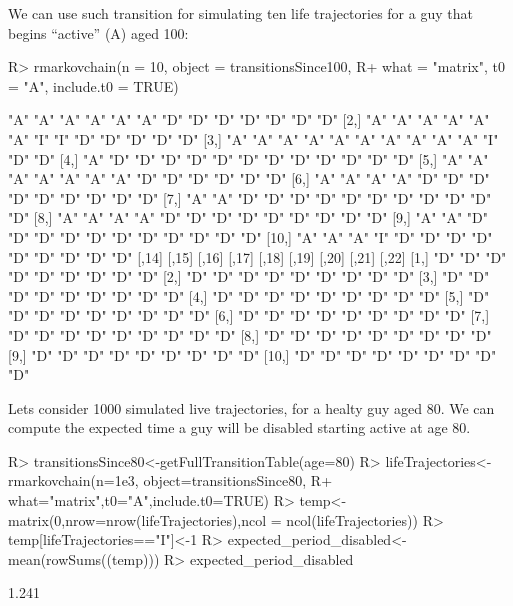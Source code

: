 \documentclass[
  nojss]{jss}
\begin{document}
We can use such transition for simulating ten life trajectories for a guy that begins ``active'' (A) aged 100:

\begin{CodeChunk}

\begin{CodeInput}
R> rmarkovchain(n = 10, object = transitionsSince100,
R+              what = "matrix", t0 = "A", include.t0 = TRUE)
\end{CodeInput}

\begin{CodeOutput}
      [,1] [,2] [,3] [,4] [,5] [,6] [,7] [,8] [,9] [,10] [,11] [,12] [,13]
 [1,] "A"  "A"  "A"  "A"  "A"  "A"  "D"  "D"  "D"  "D"   "D"   "D"   "D"  
 [2,] "A"  "A"  "A"  "A"  "A"  "A"  "I"  "I"  "D"  "D"   "D"   "D"   "D"  
 [3,] "A"  "A"  "A"  "A"  "A"  "A"  "A"  "A"  "A"  "A"   "I"   "D"   "D"  
 [4,] "A"  "D"  "D"  "D"  "D"  "D"  "D"  "D"  "D"  "D"   "D"   "D"   "D"  
 [5,] "A"  "A"  "A"  "A"  "A"  "A"  "A"  "D"  "D"  "D"   "D"   "D"   "D"  
 [6,] "A"  "A"  "A"  "A"  "D"  "D"  "D"  "D"  "D"  "D"   "D"   "D"   "D"  
 [7,] "A"  "A"  "D"  "D"  "D"  "D"  "D"  "D"  "D"  "D"   "D"   "D"   "D"  
 [8,] "A"  "A"  "A"  "A"  "D"  "D"  "D"  "D"  "D"  "D"   "D"   "D"   "D"  
 [9,] "A"  "A"  "D"  "D"  "D"  "D"  "D"  "D"  "D"  "D"   "D"   "D"   "D"  
[10,] "A"  "A"  "A"  "I"  "D"  "D"  "D"  "D"  "D"  "D"   "D"   "D"   "D"  
      [,14] [,15] [,16] [,17] [,18] [,19] [,20] [,21] [,22]
 [1,] "D"   "D"   "D"   "D"   "D"   "D"   "D"   "D"   "D"  
 [2,] "D"   "D"   "D"   "D"   "D"   "D"   "D"   "D"   "D"  
 [3,] "D"   "D"   "D"   "D"   "D"   "D"   "D"   "D"   "D"  
 [4,] "D"   "D"   "D"   "D"   "D"   "D"   "D"   "D"   "D"  
 [5,] "D"   "D"   "D"   "D"   "D"   "D"   "D"   "D"   "D"  
 [6,] "D"   "D"   "D"   "D"   "D"   "D"   "D"   "D"   "D"  
 [7,] "D"   "D"   "D"   "D"   "D"   "D"   "D"   "D"   "D"  
 [8,] "D"   "D"   "D"   "D"   "D"   "D"   "D"   "D"   "D"  
 [9,] "D"   "D"   "D"   "D"   "D"   "D"   "D"   "D"   "D"  
[10,] "D"   "D"   "D"   "D"   "D"   "D"   "D"   "D"   "D"  
\end{CodeOutput}
\end{CodeChunk}

Lets consider 1000 simulated live trajectories, for a healty guy aged 80. We can compute the expected time a guy will be disabled starting active at age 80.

\begin{CodeChunk}

\begin{CodeInput}
R> transitionsSince80<-getFullTransitionTable(age=80)
R> lifeTrajectories<-rmarkovchain(n=1e3, object=transitionsSince80,
R+                                what="matrix",t0="A",include.t0=TRUE)
R> temp<-matrix(0,nrow=nrow(lifeTrajectories),ncol = ncol(lifeTrajectories))
R> temp[lifeTrajectories=="I"]<-1
R> expected_period_disabled<-mean(rowSums((temp)))
R> expected_period_disabled
\end{CodeInput}

\begin{CodeOutput}
[1] 1.241
\end{CodeOutput}
\end{CodeChunk}
\end{document}
